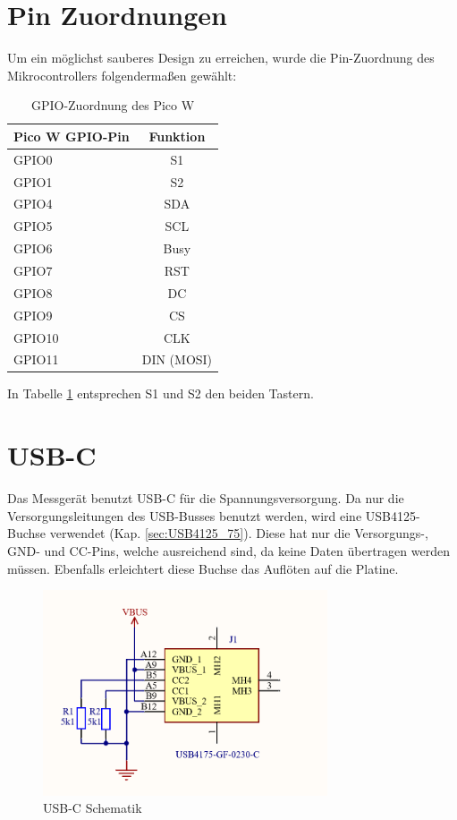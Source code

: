\begin{inhalt}
\section{Pin Zuordnungen}


   Um ein möglichst sauberes Design zu erreichen, wurde die Pin-Zuordnung des Mikrocontrollers folgendermaßen gewählt:

   \renewcommand{\arraystretch}{1.5}

\begin{table}[H]
\centering
{}
\begin{tabular}{|l|c|}
\hline
\rowcolor{cyan!20}
\textbf{Pico W GPIO-Pin} & \textbf{Funktion} \\
\hline
GPIO0 & S1 \\
\hline
GPIO1 & S2 \\
\hline
GPIO4 & SDA \\
\hline
GPIO5 & SCL \\
\hline
GPIO6 & Busy \\
\hline
GPIO7 & RST \\
\hline
GPIO8 & DC \\
\hline
GPIO9 & CS \\
\hline
GPIO10 & CLK \\
\hline
GPIO11 & DIN (MOSI) \\
\hline
\end{tabular}
\caption{GPIO-Zuordnung des Pico W}
\label{tab:GPIO_Zuordnung}
\end{table}

In Tabelle \ref{tab:GPIO_Zuordnung} entsprechen S1 und S2 den beiden Tastern. 


      \section{USB-C}

      Das Messgerät benutzt USB-C für die Spannungsversorgung. Da nur die Versorgungsleitungen des USB-Busses benutzt werden, wird eine USB4125-Buchse verwendet (Kap. \ref{sec:USB4125_75}). Diese hat nur die Versorgungs-, GND- und CC-Pins, welche ausreichend sind, da keine Daten übertragen werden müssen. Ebenfalls erleichtert diese Buchse das Auflöten auf die Platine.

\begin{figure}[!htb]
\centering
\includegraphics[width=0.75\textwidth]{files/Tobias/pics/Schaltungen/Schematik/USBC_Schematik.PNG}
\caption[USB-C Schematik]{USB-C Schematik}
\label{fig:USB-C_Schematik}
\end{figure}


\end{inhalt}
